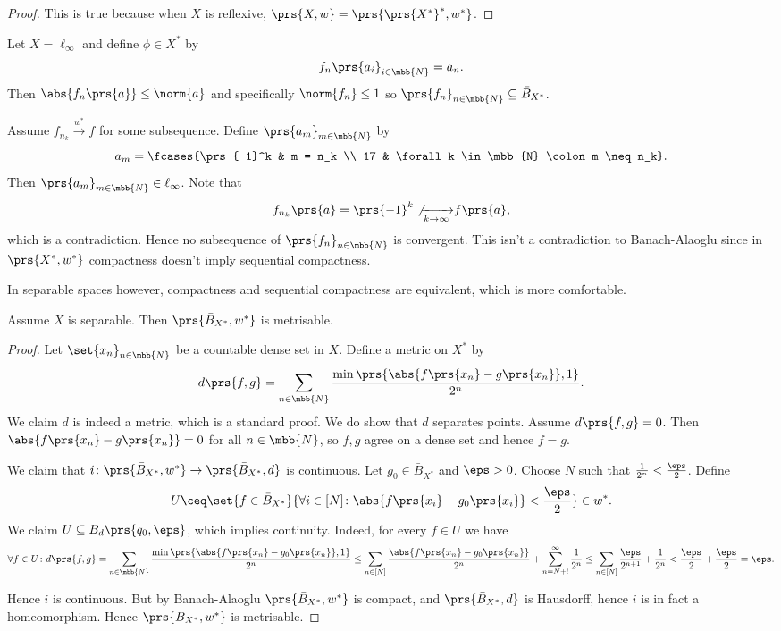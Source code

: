 \documentclass[10pt, twoside]{book}
\begin{document}
\begin{proof}
This is true because when $X$ is reflexive, $\prs{X, w} = \prs{\prs{X^*}^*, w^*}$.
\end{proof}

\begin{example}
Let $X = \ell_\infty$ and define $\phi \in X^*$ by
\[f_n\prs{a_i}_{i \in \mbb{N}} = a_n \text{.}\]
Then $\abs{f_n\prs{a}} \leq \norm{a}$ and specifically $\norm{f_n} \leq 1$ so $\prs{f_n}_{n \in \mbb{N}} \subseteq \bar{B}_{X^*}$.

Assume $f_{n_k} \xrightarrow{w^*} f$ for some subsequence.
Define $\prs{a_m}_{m \in \mbb{N}}$ by
\[a_m = \fcases{\prs{-1}^k & m = n_k \\ 17 & \forall k \in \mbb{N} \colon m \neq n_k} \text{.}\]
Then $\prs{a_m}_{m \in \mbb{N}} \in \ell_\infty$. Note that
\[f_{n_k}\prs{a} = \prs{-1}^k \not{\xrightarrow[k\to\infty]{}} f\prs{a} \text{,}\]
which is a contradiction.
Hence no subsequence of $\prs{f_n}_{n \in \mbb{N}}$ is convergent.
This isn't a contradiction to Banach-Alaoglu since in $\prs{X^*, w^*}$ compactness doesn't imply sequential compactness.

In separable spaces however, compactness and sequential compactness are equivalent, which is more comfortable.
\end{example}

\begin{theorem}
Assume $X$ is separable. Then $\prs{\bar{B}_{X^*}, w^*}$ is metrisable.
\end{theorem}

\begin{proof}
Let $\set{x_n}_{n \in \mbb{N}}$ be a countable dense set in $X$.
Define a metric on $X^*$ by
\[d\prs{f,g} = \sum_{n \in \mbb{N}} \frac{\min\prs{\abs{f\prs{x_n} - g\prs{x_n}}, 1}}{2^n} \text{.}\]
We claim $d$ is indeed a metric, which is a standard proof. We do show that $d$ separates points. Assume $d\prs{f,g} = 0$. Then $\abs{f\prs{x_n} - g\prs{x_n}} = 0$ for all $n \in \mbb{N}$, so $f,g$ agree on a dense set and hence $f=g$.

We claim that $i \colon \prs{\bar{B}_{X^*}, w^*} \to \prs{\bar{B}_{X^*}, d}$ is continuous.
Let $g_0 \in \bar{B}_{X^*}$ and $\eps > 0$. Choose $N$ such that $\frac{1}{2^n} < \frac{\eps}{2}$. Define
\[U \ceq \set{f \in \bar{B}_{X^*}}{\forall i \in [N] \colon \abs{f\prs{x_i} - g_0\prs{x_i}} < \frac{\eps}{2}} \in w^* \text{.}\]
We claim $U \subseteq B_d\prs{q_0, \eps}$, which implies continuity. Indeed, for every $f \in U$ we have
\[\forall f \in U \colon d\prs{f,g} = \sum_{n \in \mbb{N}} \frac{\min\prs{\abs{f\prs{x_n} - g_0\prs{x_n}}, 1}}{2^n} \leq \sum_{n \in [N]} \frac{\abs{f\prs{x_n} - g_0 \prs{x_n}}}{2^n} + \sum_{n = N+!}^{\infty} \frac{1}{2^n} \leq \sum_{n \in [N]} \frac{\eps}{2^{n+1}} +  \frac{1}{2^n} < \frac{\eps}{2} + \frac{\eps}{2} = \eps \text{.}\]

Hence $i$ is continuous. But by Banach-Alaoglu $\prs{\bar{B}_{X^*}, w^*}$ is compact, and $\prs{\bar{B}_{X^*}, d}$ is Hausdorff, hence $i$ is in fact a homeomorphism. Hence $\prs{\bar{B}_{X^*}, w^*}$ is metrisable.
\end{proof}
\end{document}
